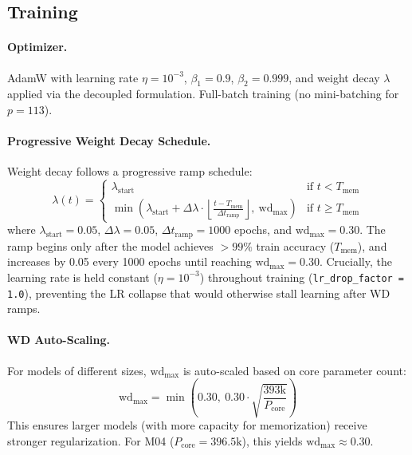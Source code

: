 \documentclass[11pt]{article}
\newcommand{\Tmem}{T_{\mathrm{mem}}}
\newcommand{\wdmax}{\mathrm{wd}_{\max}}
\newcommand{\Pcore}{P_{\mathrm{core}}}
\begin{document}
\subsection{Training}

\paragraph{Optimizer.} AdamW \citep{loshchilov2019decoupled} with learning rate $\eta = 10^{-3}$, $\beta_1 = 0.9$, $\beta_2 = 0.999$, and weight decay $\lambda$ applied via the decoupled formulation. Full-batch training (no mini-batching for $p = 113$).

\paragraph{Progressive Weight Decay Schedule.} Weight decay follows a progressive ramp schedule:
\begin{equation}
    \lambda(t) = \begin{cases}
        \lambda_{\mathrm{start}} & \text{if } t < \Tmem \\
        \min\!\left(\lambda_{\mathrm{start}} + \Delta\lambda \cdot \left\lfloor\frac{t - \Tmem}{\Delta t_{\mathrm{ramp}}}\right\rfloor,\ \wdmax\right) & \text{if } t \geq \Tmem
    \end{cases}
    \label{eq:wd_schedule}
\end{equation}
where $\lambda_{\mathrm{start}} = 0.05$, $\Delta\lambda = 0.05$, $\Delta t_{\mathrm{ramp}} = 1000$ epochs, and $\wdmax = 0.30$. The ramp begins only after the model achieves $>99\%$ train accuracy ($\Tmem$), and increases by 0.05 every 1000 epochs until reaching $\wdmax = 0.30$. Crucially, the learning rate is held constant ($\eta = 10^{-3}$) throughout training (\texttt{lr\_drop\_factor = 1.0}), preventing the LR collapse that would otherwise stall learning after WD ramps.

\paragraph{WD Auto-Scaling.} For models of different sizes, $\wdmax$ is auto-scaled based on core parameter count:
\begin{equation}
    \wdmax = \min\!\left(0.30,\ 0.30 \cdot \sqrt{\frac{393\text{k}}{\Pcore}}\right)
    \label{eq:wd_auto}
\end{equation}
This ensures larger models (with more capacity for memorization) receive stronger regularization. For M04 ($\Pcore = 396.5\text{k}$), this yields $\wdmax \approx 0.30$.
\end{document}
